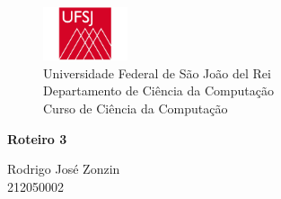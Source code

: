 \begin{figure}[t]
	\centering
	\includegraphics[width=2.5cm]{ufsj}\\
	
	{\large Universidade Federal de São João del Rei\\
		Departamento de Ciência da Computação\\
		Curso de Ciência da Computação\\}
	\label{fig:ufsj}
\end{figure}
{\Large
	\begin{center}
		\textbf{Roteiro 3}
		
	\end{center}
}

{\large 
	
	\begin{center}
		Rodrigo José Zonzin \\
		212050002
	\end{center}	
}